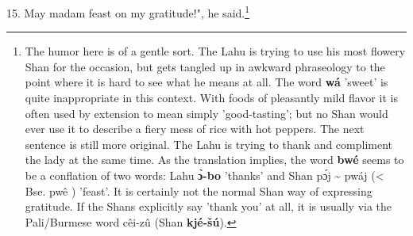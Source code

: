 15. May madam feast on my gratitude!", he said.\footnote{The humor here is of a gentle sort. The Lahu is trying to use his most flowery Shan for the occasion, but gets tangled up in awkward phraseology to the point where it is hard to see what he means at all. The word \textbf{wá} 'sweet' is quite inappropriate in this context. With foods of pleasantly mild flavor it is often used by extension to mean simply 'good-tasting'; but no Shan would ever use it to describe a fiery mess of rice with hot peppers. The next sentence is still more original. The Lahu is trying to thank and compliment the lady at the same time. As the translation implies, the word \textbf{bwé} seems to be a conflation of two words: Lahu \textbf{ɔ̀-bo} 'thanks' and Shan pɔ́j \textasciitilde{} pwáj (< Bse. pwê ) 'feast'. It is certainly not the normal Shan way of expressing gratitude. If the Shans explicitly say 'thank you' at all, it is usually via the Pali/Burmese word cêi-zû (Shan \textbf{kjé-šú}).}


